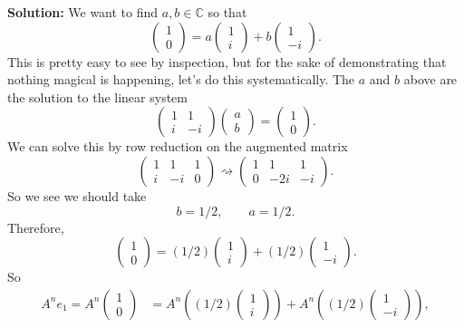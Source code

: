 \documentclass[11pt]{article}
\newcommand{\cc}{\mathbb{C}}
\begin{document}
\begin{enumerate}
\begin{enumerate}
\textbf{Solution:} We want to find $a,b \in \cc$ so that
\[\begin{pmatrix} 1 \\ 0 \end{pmatrix} = a \begin{pmatrix} 1 \\ i \end{pmatrix} + b \begin{pmatrix} 1 \\ -i \end{pmatrix}.\]
This is pretty easy to see by inspection, but for the sake of demonstrating that nothing magical is happening, let's do this systematically.
The $a$ and $b$ above are the solution to the linear system
\[\begin{pmatrix} 1 & 1 \\ i & -i \end{pmatrix} \begin{pmatrix} a \\ b \end{pmatrix} = \begin{pmatrix} 1 \\ 0 \end{pmatrix}.\]
We can solve this by row reduction on the augmented matrix
\[\begin{pmatrix} 1 & 1 & 1  \\ i & -i & 0  \end{pmatrix} \rightsquigarrow \begin{pmatrix} 1 & 1 & 1  \\ 0 & -2i & -i  \end{pmatrix}.\]
So we see we should take
\[b = 1/2, \qquad a = 1/2.\]
Therefore, 
\[\begin{pmatrix} 1 \\ 0 \end{pmatrix} = (1/2) \begin{pmatrix} 1 \\ i \end{pmatrix} + (1/2) \begin{pmatrix} 1 \\ -i \end{pmatrix}. \]
So
\begin{align*}
A^n e_1 = A^n\begin{pmatrix} 1 \\ 0 \end{pmatrix} &= A^n \left((1/2) \begin{pmatrix} 1 \\ i \end{pmatrix}\right) + A^n\left( (1/2) \begin{pmatrix} 1 \\ -i \end{pmatrix}\right),\\

\end{align*}
\end{enumerate}
\end{enumerate}
\end{document}
